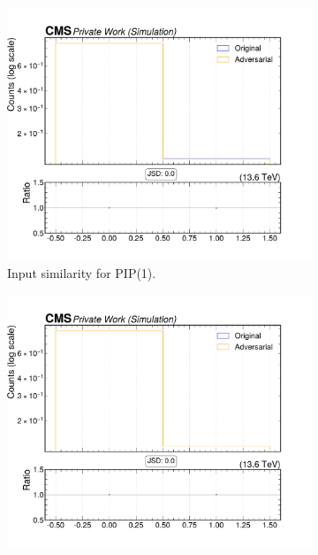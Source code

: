 \begin{figure}[htbp]
  \centering
  \begin{subfigure}[t]{0.32\textwidth}
    \includegraphics[width=\linewidth]{media/output/features/compare/intprob_1/cmp_npf_arr_Npfcan_isGamma.pdf}
    \caption{Input similarity for PIP(1).}
  \end{subfigure}\hfill
  \begin{subfigure}[t]{0.32\textwidth}
    \includegraphics[width=\linewidth]{media/output/features/compare/intprob_2/cmp_npf_arr_Npfcan_isGamma.pdf}

\end{subfigure}
\end{figure}
